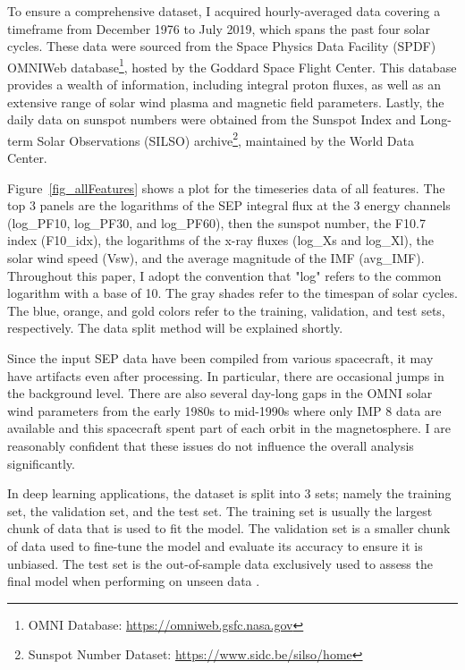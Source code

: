 To ensure a comprehensive dataset, I acquired hourly-averaged data covering a timeframe from December 1976 to July 2019, which spans the past four solar cycles. These data were sourced from the Space Physics Data Facility (SPDF) OMNIWeb database\footnote{OMNI Database: \url{https://omniweb.gsfc.nasa.gov}}, hosted by the Goddard Space Flight Center. This database provides a wealth of information, including integral proton fluxes, as well as an extensive range of solar wind plasma and magnetic field parameters.
Lastly, the daily data on sunspot numbers were obtained from the Sunspot Index and Long-term Solar Observations (SILSO) archive\footnote{Sunspot Number Dataset: \url{https://www.sidc.be/silso/home}}, maintained by the World Data Center.

Figure~\ref{fig_allFeatures} shows a plot for the timeseries data of all features.
The top 3 panels are the logarithms of the SEP integral flux at the 3 energy channels (log\_PF10, log\_PF30, and log\_PF60), then the sunspot number, the F10.7 index (F10\_idx), the logarithms of the x-ray fluxes (log\_Xs and log\_Xl), the solar wind speed (Vsw), and the average magnitude of the IMF (avg\_IMF).
Throughout this paper, I adopt the convention that "log" refers to the common logarithm with a base of 10.
The gray shades refer to the timespan of solar cycles.
The blue, orange, and gold colors refer to the training, validation, and test sets, respectively. The data split method will be explained shortly.

Since the input SEP data have been compiled from various spacecraft, it may have artifacts even after processing. In particular, there are occasional jumps in the background level. There are also several day-long gaps in the OMNI solar wind parameters from the early 1980s to mid-1990s where only IMP 8 data are available and this spacecraft spent part of each orbit in the magnetosphere. I are reasonably confident that these issues do not influence the overall analysis significantly.

In deep learning applications, the dataset is split into 3 sets; namely the training set, the validation set, and the test set. The training set is usually the largest chunk of data that is used to fit the model. The validation set is a smaller chunk of data used to fine-tune the model and evaluate its accuracy to ensure it is unbiased. The test set is the out-of-sample data exclusively used to assess the final model when performing on unseen data \citep{ripley_2007}.

